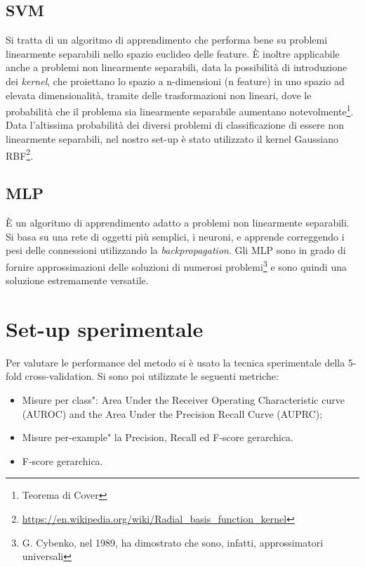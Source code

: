 \documentclass{article}
\begin{document}
\subsection{SVM}
Si tratta di un algoritmo di apprendimento che performa bene su problemi linearmente separabili nello spazio euclideo delle feature. È inoltre applicabile anche a problemi non linearmente separabili, data la possibilità di introduzione dei \emph{kernel}, che proiettano lo spazio a n-dimensioni (n feature) in uno spazio ad elevata dimensionalità, tramite delle trasformazioni non lineari, dove le probabilità che il problema sia linearmente separabile aumentano notevolmente\footnote{Teorema di Cover}.
\newline
\newline
Data l'altissima probabilità dei diversi problemi di classificazione di essere non linearmente separabili, nel nostro set-up è stato utilizzato il kernel Gaussiano RBF\footnote{\url{https://en.wikipedia.org/wiki/Radial_basis_function_kernel}}.

\subsection{MLP}
È un algoritmo di apprendimento adatto a problemi non linearmente separabili. Si basa su una rete di oggetti più semplici, i neuroni, e apprende correggendo i pesi delle connessioni utilizzando la \emph{backpropagation}. Gli MLP sono in grado di fornire approssimazioni delle soluzioni di numerosi problemi\footnote{G. Cybenko, nel 1989, ha dimostrato che sono, infatti, approssimatori universali} e sono quindi una soluzione estremamente versatile.

\section{Set-up sperimentale}

Per valutare le performance del metodo si è usato la tecnica sperimentale della 5-fold
cross-validation.  Si sono poi utilizzate le seguenti metriche:

\begin{itemize}
\item Misure per  class":   Area  Under  the  Receiver  Operating  Characteristic
curve (AUROC) and the Area Under the Precision Recall Curve (AUPRC);
\item Misure per-example" la Precision, Recall ed F-score gerarchica.
\item F-score gerarchica.
\end{itemize}








\end{document}
